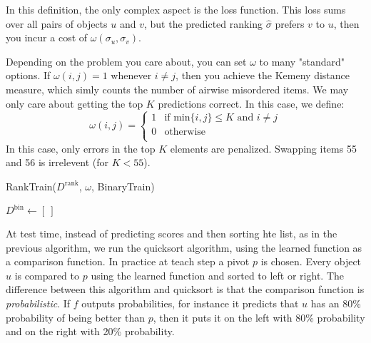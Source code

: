 In this definition, the only complex aspect is the loss function. This loss sums over all pairs of objects \(u\) and \(v\), but the predicted ranking \(\hat{\sigma}\) prefers \(v\) to \(u\), then you incur a cost of \(\omega(\sigma_u,\sigma_v)\).

Depending on the problem you care about, you can set \(\omega\) to many "standard" options. If \(\omega(i,j) = 1\) whenever \(i \neq j\), then you achieve the Kemeny distance measure, which simly counts the number of airwise misordered items. We may only care about getting the top \(K\) predictions correct. In this case, we define:
\begin{equation}
    \omega(i,j) = \begin{cases}
        1 &\text{if min}\{i,j\} \leq K \text{ and } i \neq j\\
        0 &\text{otherwise}\\
    \end{cases}
\end{equation}
In this case, only errors in the top \(K\) elements are penalized. Swapping items 55 and 56 is irrelevent (for \(K < 55\)).

\begin{algorithm}
    \caption{RankTrain($D^\text{rank}$, $\omega$, BinaryTrain)}
    \label{alg:rank_train}
$D^\text{bin} \gets [\ ]$\;
\end{algorithm}

At test time, instead of predicting scores and then sorting hte list, as in the previous algorithm, we run the quicksort algorithm, using the learned function as a comparison function. In practice at teach step a pivot \(p\) is chosen. Every object \(u\) is compared to \(p\) using the learned function and sorted to left or right. The difference between this algorithm and quicksort is that the comparison function is \emph{probabilistic}. If \(f\) outputs probabilities, for instance it predicts that \(u\) has an 80\% probability of being better than \(p\), then it puts it on the left with 80\% probability and on the right with 20\% probability.


